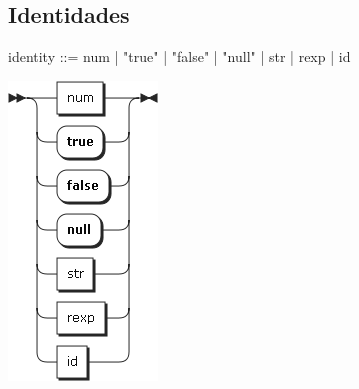 \subsection{Identidades}
\begin{multicols}{2}
\begin{myverbatim}      
identity ::=   num
            |  "true"
            |  "false"
            |  "null"
            |  str
            |  rexp
            |  id 
\end{myverbatim}  
\columnbreak	
\begin{center}
\includegraphics[scale=0.4]{diagram/identity.png} \\
\end{center}
\end{multicols}

